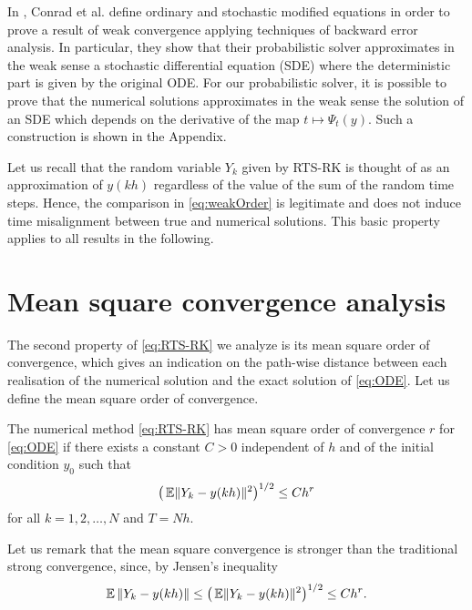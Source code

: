 \documentclass[10pt]{article}
\begin{document}
\begin{remark}\label{rem:sde} In \cite{CGS17}, Conrad et al. define ordinary and stochastic modified equations in order to prove a result of weak convergence applying techniques of backward error analysis. In particular, they show that their probabilistic solver approximates in the weak sense a stochastic differential equation (SDE) where the deterministic part is given by the original ODE. For our probabilistic solver, it is possible to prove that the numerical solutions approximates in the weak sense the solution of an SDE which depends on the derivative of the map $t \mapsto \Psi_t(y)$. Such a construction is shown in the Appendix.
\end{remark}

\begin{remark} Let us recall that the random variable $Y_k$ given by RTS-RK is thought of as an approximation of $y(kh)$ regardless of the value of the sum of the random time steps. Hence, the comparison in \eqref{eq:weakOrder} is legitimate and does not induce time misalignment between true and numerical solutions. This basic property applies to all results in the following.
\end{remark}

\section{Mean square convergence analysis}\label{sec:StrongOrder}

The second property of \eqref{eq:RTS-RK} we analyze is its mean square order of convergence, which gives an indication on the path-wise distance between each realisation of the numerical solution and the exact solution of \eqref{eq:ODE}. Let us define the mean square order of convergence. 
\begin{definition} The numerical method \eqref{eq:RTS-RK} has mean square order of convergence $r$ for \eqref{eq:ODE} if there exists a constant $C > 0$ independent of $h$ and of the initial condition $y_0$ such that
	\begin{equation}
	\big(\operatorname{\mathbb{E}}\lVert Y_k - y(kh)\rVert^2\big)^{1/2} \leq Ch^r
	\end{equation}
	for all $k = 1, 2, \ldots, N$ and $T = Nh$.
\end{definition} 
\begin{remark} Let us remark that the mean square convergence is stronger than the traditional strong convergence, since, by Jensen's inequality 
	\begin{equation}
		\operatorname{\mathbb{E}}{\lVert Y_k - y(kh)\rVert} \leq \big(\operatorname{\mathbb{E}}\lVert Y_k - y(kh)\rVert^2\big)^{1/2} \leq Ch^r.
	\end{equation}	
\end{remark}
\end{document}
